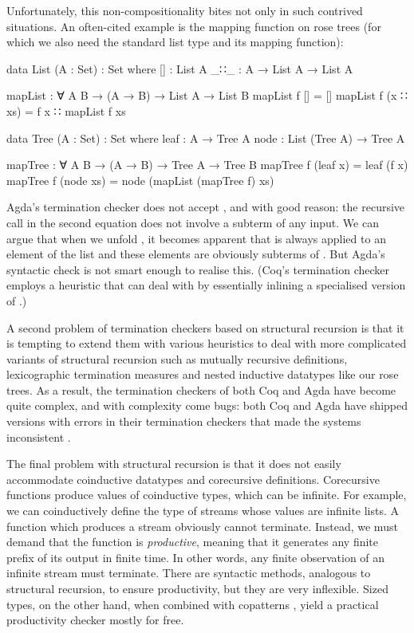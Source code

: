 Unfortunately, this non-compositionality bites not only in such contrived
situations. An often-cited example is the mapping function on rose trees (for
which we also need the standard list type and its mapping function):
\begin{code}
  data List (A : Set) : Set where
    []  : List A
    _∷_ : A → List A → List A

  mapList : ∀ {A B} → (A → B) → List A → List B
  mapList f []       = []
  mapList f (x ∷ xs) = f x ∷ mapList f xs

  data Tree (A : Set) : Set where
    leaf : A → Tree A
    node : List (Tree A) → Tree A

  mapTree : ∀ {A B} → (A → B) → Tree A → Tree B
  mapTree f (leaf x)  = leaf (f x)
  mapTree f (node xs) = node (mapList (mapTree f) xs)
\end{code}
Agda's termination checker does not accept , and with good
reason: the recursive call in the second equation does not involve a subterm of
any input. We can argue that when we unfold , it becomes apparent
that  is always applied to an element of the list  and
these elements are obviously subterms of . But Agda's syntactic check
is not smart enough to realise this. (Coq's termination checker employs a
heuristic that can deal with  by essentially inlining a
specialised version of .)

A second problem of termination checkers based on structural recursion is that
it is tempting to extend them with various heuristics to deal with more
complicated variants of structural recursion such as mutually recursive
definitions, lexicographic termination measures and nested inductive datatypes
like our rose trees. As a result, the termination checkers of both Coq and Agda
have become quite complex, and with complexity come bugs: both Coq and Agda have
shipped versions with errors in their termination checkers that made the systems
inconsistent \cite{coqbug2013,agdabug2013}.

The final problem with structural recursion is that it does not easily
accommodate coinductive datatypes and corecursive definitions. Corecursive
functions produce values of coinductive types, which can be infinite. For
example, we can coinductively define the type of streams whose values are
infinite lists. A function which produces a stream obviously cannot terminate.
Instead, we must demand that the function is \emph{productive}, meaning that it
generates any finite prefix of its output in finite time. In other words, any
finite observation of an infinite stream must terminate. There are syntactic
methods, analogous to structural recursion, to ensure productivity, but they are
very inflexible. Sized types, on the other hand, when combined with copatterns
\cite{abel2016}, yield a practical productivity checker mostly for free.

